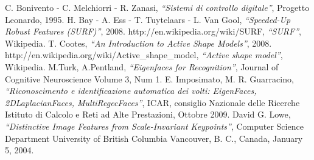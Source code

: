 \documentclass[a4paper, 12pt]{report}
\numberwithin{equation}{section}
\begin{document}
\listoffigures


\begin{thebibliography}{9}
        C. Bonivento - C. Melchiorri - R. Zanasi,
            \emph{``Sistemi di controllo digitale''},
          Progetto Leonardo, 1995.
          H. Bay - A. Ess - T. Tuytelaars - L. Van Gool,
            \emph{``Speeded-Up Robust Features (SURF)''},
          2008.
           http://en.wikipedia.org/wiki/SURF,
            \emph{``SURF''},
          Wikipedia.
          T. Cootes,
            \emph{``An Introduction to Active Shape Models''},
          2008.
          http://en.wikipedia.org/wiki/Active\_shape\_model,
          \emph{``Active shape model''}, Wikipedia.
          M.Turk, A.Pentland,
            \emph{``Eigenfaces for Recognition''},
          Journal of Cognitive Neuroscience Volume 3, Num 1.
        E. Imposimato, M. R. Guarracino,
            \emph{``Riconoscimento e identificazione automatica dei volti: EigenFaces, 2DLaplacianFaces, MultiRegecFaces''},
          ICAR, consiglio Nazionale delle Ricerche Istituto di Calcolo e Reti ad Alte Prestazioni, Ottobre 2009.
        David G. Lowe,
            \emph{``Distinctive Image Features from Scale-Invariant Keypoints''},
          Computer Science Department University of British Columbia Vancouver,
          B. C., Canada, January 5, 2004.
          
          
\end{thebibliography}
\end{document}
